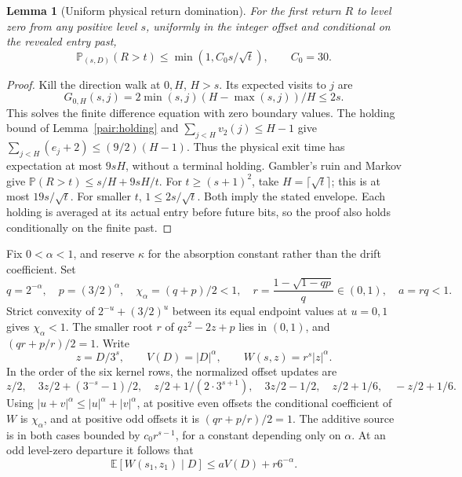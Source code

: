 \documentclass[11pt]{amsart}
\newtheorem{lemma}[theorem]{Lemma}
\theoremstyle{definition}
\theoremstyle{remark}
\newcommand{\E}{\mathbb E}
\newcommand{\PP}{\mathbb P}
\begin{document}
\begin{lemma}[Uniform physical return domination]\label{pair:return-bound}\label{family:return-bound}
For the first return $R$ to level zero from any positive level $s$,
uniformly in the integer offset and conditional on the revealed entry past,
\begin{equation}\label{pair:return-envelope}
 \PP_{(s,D)}(R>t)\le\min(1,C_0s/\sqrt t),\qquad C_0=30.
\end{equation}
\end{lemma}
\begin{proof}
Kill the direction walk at $0,H$, $H>s$. Its expected visits to $j$ are
\[
 G_{0,H}(s,j)=2\min(s,j)(H-\max(s,j))/H\le2s.
\]
This solves the finite difference equation with zero boundary values.
The holding bound of Lemma~\ref{pair:holding} and
$\sum_{j<H}v_2(j)\le H-1$ give
$\sum_{j<H}(e_j+2)\le(9/2)(H-1)$. Thus the physical exit time has
expectation at most $9sH$, without a terminal holding. Gambler's ruin
and Markov give $\PP(R>t)\le s/H+9sH/t$.
For $t\ge(s+1)^2$, take $H=\lceil\sqrt t\rceil$; this is at most
$19s/\sqrt t$. For smaller $t$, $1\le2s/\sqrt t$. Both imply the
stated envelope. Each holding is averaged at its actual entry before
future bits, so the proof also holds conditionally on the finite past.
\end{proof}

Fix $0<\alpha<1$, and reserve $\kappa$ for the absorption constant rather
than the drift coefficient.  Set
\begin{equation}\label{pair:driftconstants}
 q=2^{-\alpha},\quad p=(3/2)^\alpha,\quad
 \chi_\alpha=(q+p)/2<1,\quad
 r=\frac{1-\sqrt{1-qp}}q\in(0,1),\quad a=rq<1.
\end{equation}
Strict convexity of $2^{-u}+(3/2)^u$ between its equal endpoint values
at $u=0,1$ gives $\chi_\alpha<1$.  The smaller root $r$ of
$qz^2-2z+p$ lies in $(0,1)$, and
$(qr+p/r)/2=1$.  Write
\[
 z=D/3^s,\qquad V(D)=|D|^\alpha,\qquad
 W(s,z)=r^s|z|^\alpha.
\]
In the order of the six kernel rows, the normalized offset updates are
\[
 z/2,\quad 3z/2+(3^{-s}-1)/2,\quad
 z/2+1/(2\cdot3^{s+1}),\quad 3z/2-1/2,\quad
 z/2+1/6,\quad -z/2+1/6.
\]
Using $|u+v|^\alpha\le |u|^\alpha+|v|^\alpha$, at positive even
offsets the conditional coefficient of $W$ is $\chi_\alpha$, and at
positive odd offsets it is $(qr+p/r)/2=1$.  The additive source is in
both cases bounded by $c_0r^{s-1}$, for a constant depending only on
$\alpha$.  At an odd level-zero departure it follows that
\begin{equation}\label{pair:departuremoment}
 \E[W(s_1,z_1)\mid D]\le aV(D)+r6^{-\alpha}.
\end{equation}
\end{document}
